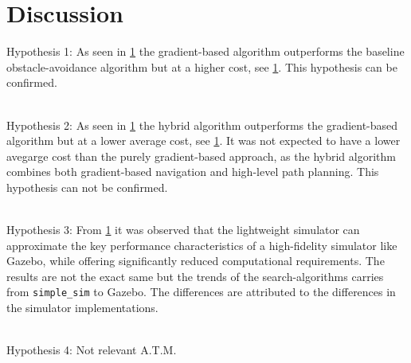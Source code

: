 \section{Discussion}
Hypothesis 1: 
As seen in \cref{} the gradient-based algorithm outperforms the baseline obstacle-avoidance algorithm but at a higher cost, see \cref{}.
This hypothesis can be confirmed.

\\
Hypothesis 2:
As seen in \cref{} the hybrid algorithm outperforms the gradient-based algorithm but at a lower average cost, see \cref{}. It was not expected to have a lower avegarge cost than the purely gradient-based approach, as the hybrid algorithm combines both gradient-based navigation and high-level path planning.
This hypothesis can not be confirmed.

\\
Hypothesis 3:
From \cref{} it was observed that the lightweight simulator can approximate the key performance characteristics of a high-fidelity simulator like Gazebo, while offering significantly reduced computational requirements. The results are not the exact same but the trends of the search-algorithms carries from \texttt{simple\_sim} to Gazebo. The differences are attributed to the differences in the simulator implementations.

\\
Hypothesis 4:
Not relevant A.T.M.
